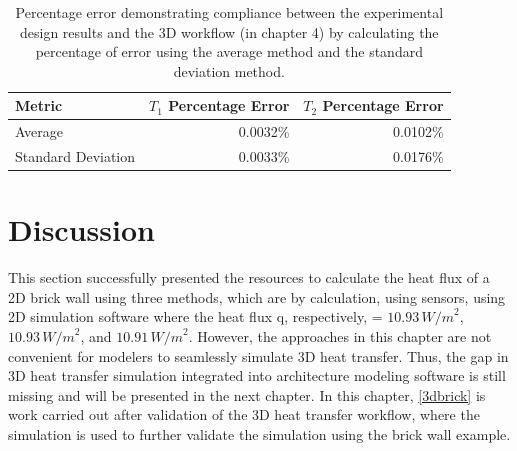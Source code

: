 \begin{table}[tb]
\caption[2D Results Percentage error]{Percentage error demonstrating compliance between the experimental design results and the 3D workflow (in chapter 4) by calculating the percentage of error using the average method and the standard deviation method.}
    \label{error2d}
     \centering
 \begin{tabular}{lrr}
        \toprule
        Metric & $T_1$ Percentage Error & $T_2$ Percentage Error \\
        \midrule
        Average & 0.0032\% & 0.0102\% \\
        Standard Deviation & 0.0033\% & 0.0176\% \\
        \bottomrule
    \end{tabular}
\end{table}






\section{Discussion}
This section successfully presented the resources to calculate the heat flux of a 2D brick wall using three methods, which are by calculation, using sensors, using 2D simulation software where the heat flux q, respectively, = \( 10.93 \, {W/m}^2 \), \( 10.93 \, {W/m}^2 \), and \( 10.91 \, {W/m}^2 \). However, the approaches in this chapter are not convenient for modelers to seamlessly simulate 3D heat transfer. 
Thus, the gap in 3D heat transfer simulation integrated into architecture modeling software is still missing and will be presented in the next chapter.  
In this chapter, \ref{3dbrick} is work carried out after validation of the 3D heat transfer workflow, where the simulation is used to further validate the simulation using the brick wall example.


